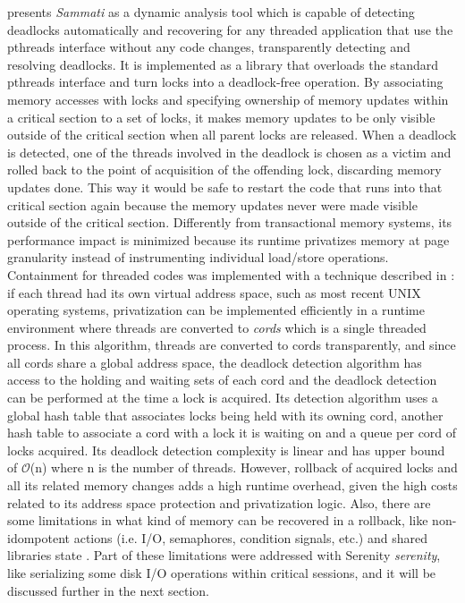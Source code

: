 \citet{sammati} presents \emph{Sammati} as a dynamic analysis tool which is capable of detecting deadlocks automatically and
recovering for any threaded application that use the pthreads interface without any code changes, transparently detecting and resolving deadlocks.
It is implemented as a library that overloads the standard pthreads interface and turn locks into a deadlock-free operation.
By associating memory accesses with locks and specifying ownership of memory updates within a critical section to a set of locks,
it makes memory updates to be only visible outside of the critical section when all parent locks are released.
When a deadlock is detected, one of the threads involved in the deadlock is
chosen as a victim and rolled back to the point of acquisition of the offending lock, discarding memory updates done.
This way it would be safe to restart the code that runs into that critical section again because the memory updates never
were made visible outside of the critical section. Differently from transactional memory systems,
its performance impact is minimized because its runtime privatizes memory at page granularity instead of instrumenting
individual load/store operations. Containment for threaded codes was implemented with a technique described in \citep{berger}:
if each thread had its own virtual address space, such as most recent UNIX operating systems,
privatization can be implemented efficiently in a runtime environment where threads are converted to \emph{cords} which is a single threaded process.
In this algorithm, threads are converted to cords transparently, and since all cords share a global address space, the deadlock detection algorithm
has access to the holding and waiting sets of each cord and the deadlock detection can be performed at the time a lock is acquired.
Its detection algorithm uses a global hash table that associates locks being held with its owning cord, another hash table to associate a cord with a lock it is waiting on and a
queue per cord of locks acquired. Its deadlock detection complexity is linear and has upper bound of $\mathcal{O}$(n) where n is the number of threads.
However, rollback of acquired locks and all its related memory changes adds a high runtime overhead, given the high costs related to its address space protection
and privatization logic. Also, there are some limitations in what kind of memory can be recovered in a rollback, like
non-idompotent actions (i.e. I/O, semaphores, condition signals, etc.) and shared libraries state \citep{pyla}.
Part of these limitations were addressed with Serenity \emph{serenity}, like serializing some disk I/O operations within critical sessions,
and it will be discussed further in the next section.


